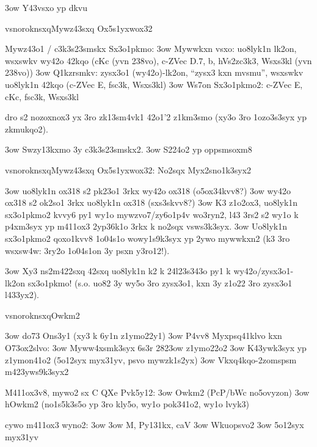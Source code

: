 
\s3ow Y43vsxo yp dkvu

  \2vsnoroknsxq{Mywz43sxq Ox5s1yxwox32}
  
  Mywz43o1 / c3k3s23smskx Sx3o1pkmo:
  \s3ow Mywwkxn vsxo: uo8lyk1n lk2on, wsxswkv wy42o 42kqo (cKc (yvn
    238vo), c-ZVec D.7, b, hVs2zc3k3, Wsxs3kl (yvn 238vo))
  \s3ow Q1kzrsmkv: zysx3o1 (wy42o)-lk2on, ``zysx3 kxn mvsmu'', wsxswkv
    uo8lyk1n 42kqo (c-ZVec E, fsc3k, Wsxs3kl)
  \s3ow Ws7on Sx3o1pkmo2: c-ZVec E, cKc, fsc3k, Wsxs3kl
  
  dro  s2 nozoxnox3 yx 3ro zk13sm4vk1 42o1'2 z1km3smo
  (xy3o 3ro 1ozo3s3syx yp zkmukqo2).


\s3ow Swzy13kxmo 3y c3k3s23smskx2. 
\s3ow S224o2 yp oppsmsoxm8

  \2vsnoroknsxq{Mywz43sxq Ox5s1yxwox32: No2sqx Myx2sno1k3syx2}
  
  \s3ow uo8lyk1n ox318 s2 pk23o1 3rkx wy42o ox318 (o5ox34kvv8?)
  \s3ow wy42o ox318 s2 ok2so1 3rkx uo8lyk1n ox318 (sxs3skvv8?)
  \s3ow K3 z1o2ox3, uo8lyk1n sx3o1pkmo2 kvvy6 py1 wy1o
    mywzvo7/zy6o1p4v wo3ryn2, l43 3rs2 s2 wy1o k p4xm3syx yp m411ox3
    2yp36k1o 3rkx k no2sqx vsws3k3syx.
  \s3ow Uo8lyk1n sx3o1pkmo2 qoxo1kvv8 1o04s1o wowy1s9k3syx yp 2ywo
    mywwkxn2 (k3 3ro wsxsw4w: 3ry2o 1o04s1on 3y psxn y3ro12!).

\s3ow Xy3 ns2m422sxq 42sxq uo8lyk1n k2 k 24l23s343o py1 k
  wy42o/zysx3o1-lk2on sx3o1pkmo!  (s.o. uo82 3y wy5o 3ro zysx3o1, kxn
  3y z1o22 3ro zysx3o1 l433yx2).

  \2vsnoroknsxq{Owkm2}

  \s3ow do73 Ons3y1 (xy3 k 6y1n z1ymo22y1)
  \s3ow P4vv8 Myxpsq41klvo kxn O73ox2slvo:
    \s3ow Myww4xsmk3syx 6s3r 2823ow z1ymo22o2
    \s3ow K43ywk3syx yp z1ymon41o2 (5o12syx myx31yv, psvo mywzk1s2yx)
    \s3ow Vkxq4kqo-2zomspsm m423yws9k3syx2

  M411ox3v8, mywo2 sx C QXe Pvk5y12:
  \s3ow Owkm2 (PcP/bWc no5ovyzon)
  \s3ow hOwkm2 (no1s5k3s5o yp 3ro kly5o, wy1o pok341o2, wy1o lvyk3)
  

cywo m411ox3 wyno2:
\s3ow \Vkdoh
\s3ow M, Py131kx, caV
\s3ow Wkuopsvo2
\s3ow 5o12syx myx31yv

